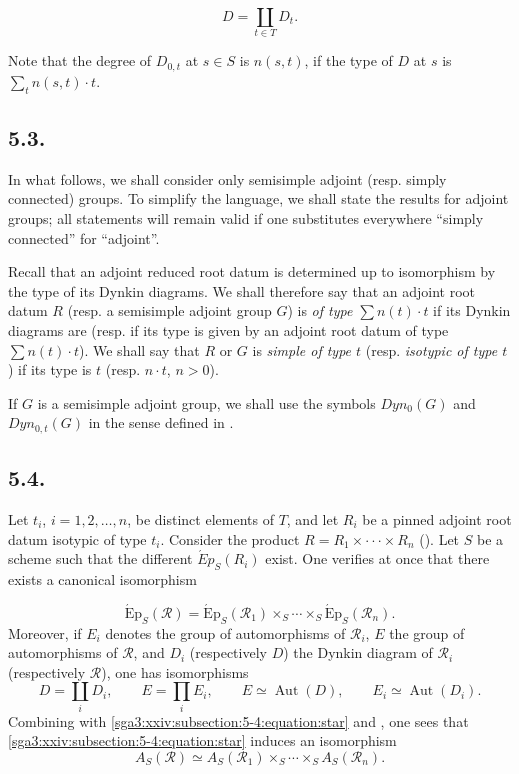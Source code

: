 \[
  D=\coprod_{t\in T}D_t.
\]

Note that the degree of \(D_{0, t}\) at \(s \in S\) is \(n(s, t)\), if the type of \(D\) at \(s\) is \(\sum_{t} n(s, t) \cdot t\).

\subsection*{5.3.}

In what follows, we shall consider only semisimple adjoint (resp. simply connected) groups. To simplify the language, we
shall state the results for adjoint groups; all statements will remain valid if one substitutes everywhere ``simply
connected'' for ``adjoint''.

Recall that an adjoint reduced root datum is determined up to isomorphism by the type of its Dynkin diagrams. We shall
therefore say that an adjoint root datum \(R\) (resp. a semisimple adjoint group \(G\)) is \emph{of type \(\sum n(t) \cdot t\)} if
its Dynkin diagrams are (resp. if its type is given by an adjoint root datum of type \(\sum n(t) \cdot t\)). We shall say
that \(R\) or \(G\) is \emph{simple of type \(t\)} (resp. \emph{isotypic of type \(t\)}) if its type is \(t\) (resp. \(n \cdot t\), \(n > 0\)).

If \(G\) is a semisimple adjoint group, we shall use the symbols \(Dyn_{0}(G)\) and \(Dyn_{0, t}(G)\) in the sense defined in
.

\subsection*{5.4.}

Let \(t_i\), \(i=1,2,\ldots,n\), be distinct elements of \(T\), and let \(R_i\) be a pinned adjoint root datum isotypic of
type \(t_{i}\). Consider the product \(R = R_{1} \times \cdot\cdot\cdot \times R_{n}\) (). Let \(S\) be a
scheme such that the different \(\acute{E}p_{S}(R_{i})\) exist. One verifies at once that there exists a
canonical isomorphism

\[
  \tag{*}\label{sga3:xxiv:subsection:5-4:equation:star}
  \operatorname{\acute{E}p}_S(\mathscr R)
  =
  \operatorname{\acute{E}p}_S(\mathscr R_1)
  \times_S\cdots\times_S
  \operatorname{\acute{E}p}_S(\mathscr R_n).
\]
Moreover, if \(E_i\) denotes the group of automorphisms of \(\mathscr R_i\), \(E\) the group of
automorphisms of \(\mathscr R\), and \(D_i\) \textup{(}respectively \(D\)\textup{)} the Dynkin diagram of
\(\mathscr R_i\) \textup{(}respectively \(\mathscr R\)\textup{)}, one has isomorphisms
\[
  D=\coprod_i D_i,\qquad E=\prod_i E_i,\qquad
  E\simeq\operatorname{Aut}(D),\qquad E_i\simeq\operatorname{Aut}(D_i).
\]
Combining with \eqref{sga3:xxiv:subsection:5-4:equation:star} and , one sees
that \eqref{sga3:xxiv:subsection:5-4:equation:star} induces an isomorphism
\[
  A_S(\mathscr R)\simeq A_S(\mathscr R_1)\times_S\cdots\times_S A_S(\mathscr R_n).
\]


